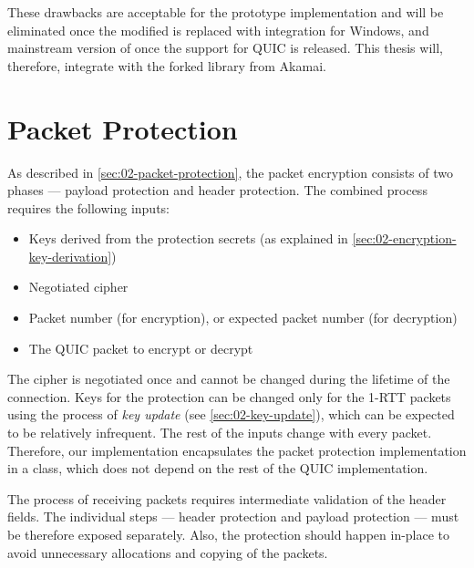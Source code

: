 These drawbacks are acceptable for the prototype implementation and will be eliminated once the
modified \libopenssl{} is replaced with \libschannel{} integration for Windows, and mainstream
version of \libopenssl{} once the support for QUIC is released. This thesis will, therefore,
integrate with the forked \libopenssl{} library from Akamai.

\section{Packet Protection}\label{sec:03-packet-protection}

As described in \autoref{sec:02-packet-protection}, the packet encryption consists of two phases ---
payload protection and header protection. The combined process requires the following inputs:

\begin{itemize}

  \item Keys derived from the protection secrets (as explained in
\autoref{sec:02-encryption-key-derivation})

  \item Negotiated cipher

  \item Packet number (for encryption), or expected packet number (for decryption)

  \item The QUIC packet to encrypt or decrypt

\end{itemize}

The cipher is negotiated once and cannot be changed during the lifetime of the connection. Keys for
the protection can be changed only for the 1-RTT packets using the process of \textit{key update}
(see \autoref{sec:02-key-update}), which can be expected to be relatively infrequent. The rest of
the inputs change with every packet. Therefore, our implementation encapsulates the packet
protection implementation in a  class, which does not depend on the rest of the
QUIC implementation.

The process of receiving packets requires intermediate validation of the header fields. The
individual steps --- header protection and payload protection --- must be therefore exposed
separately. Also, the protection should happen in-place to avoid unnecessary allocations and copying
of the packets.

